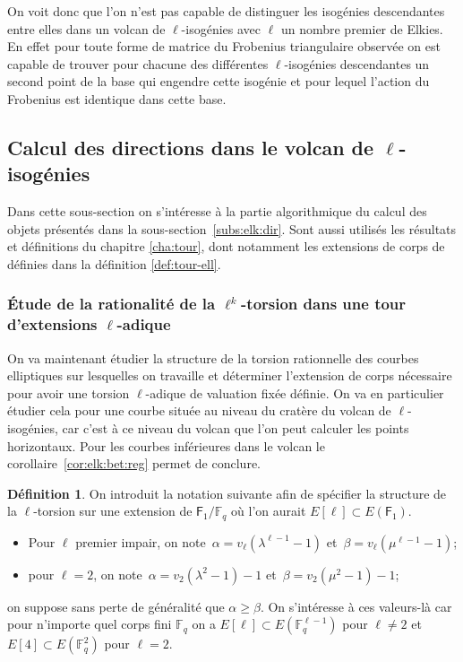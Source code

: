 \documentclass[10pt,a4paper]{book}
\theoremstyle{plain}
\theoremstyle{definition}
\theoremstyle{definition}
\theoremstyle{definition}
\theoremstyle{definition}
\newtheorem{defi}[thm]{Définition}
\theoremstyle{remark}
\theoremstyle{remark}
\theoremstyle{definition}
\begin{document}
On voit donc que l'on n'est pas capable de distinguer les isogénies 
descendantes entre elles dans un volcan de $\ell$-isogénies avec $\ell$ un 
nombre premier de Elkies. En effet pour toute forme de matrice du Frobenius 
triangulaire observée on est capable de trouver pour chacune des différentes 
$\ell$-isogénies descendantes un second point de la base qui engendre cette
isogénie et pour lequel l'action du Frobenius est identique dans cette base.

\subsection{Calcul des directions dans le volcan de $\ell$-isogénies}
\label{sub:con:poi}

Dans cette sous-section on s'intéresse à la partie algorithmique du calcul des objets présentés dans la sous-section~\ref{subs:elk:dir}. Sont aussi utilisés les résultats et définitions du chapitre \ref{cha:tour}, dont notamment les extensions de corps de définies dans la définition \ref{def:tour-ell}.

\subsubsection{\'Etude de la rationalité de la $\ell^k$-torsion dans une tour d'extensions $\ell$-adique}
\label{sub:classes}

On va maintenant étudier la structure de la torsion rationnelle des courbes 
elliptiques sur lesquelles on travaille et déterminer l'extension de corps 
nécessaire pour avoir une torsion $\ell$-adique de valuation fixée définie.
On va en particulier étudier cela pour une courbe située au niveau du cratère
du volcan de $\ell$-isogénies, car c'est à ce niveau du volcan que l'on peut 
calculer les points horizontaux. Pour les courbes inférieures dans le volcan
le corollaire~\ref{cor:elk:bet:reg} permet de conclure. 

\begin{defi}
\label{def:alp:bet}
On introduit la notation suivante afin de spécifier la structure de la 
$\ell$-torsion sur une extension de $\mathsf{F}_1 /\mathbb{F}_q$ où l'on aurait
$E[\ell] \subset E(\mathsf{F}_1)$.
\begin{itemize}
\item Pour $\ell$ premier impair, on note~$\alpha= v_{\ell}(\lambda^{\ell-1}-1)$ 
et~$\beta=v_{\ell}(\mu^{\ell-1}-1)$; 
\item pour $\ell=2$, on note~$\alpha=v_2(\lambda^2-1)-1$ et~$\beta = v_2(\mu^2-1)-1$;
\end{itemize}
on suppose sans perte de généralité que $\alpha \geqslant \beta$. On s'intéresse à ces 
valeurs-là car pour n'importe quel corps fini $\mathbb{F}_q$ on a $E[\ell] 
\subset E(\mathbb{F}_q^{\ell-1})$ pour $\ell \neq 2$ et $E[4] \subset 
E(\mathbb{F}_q^{2})$ pour $\ell=2$. 
\end{defi}
 
\end{document}

